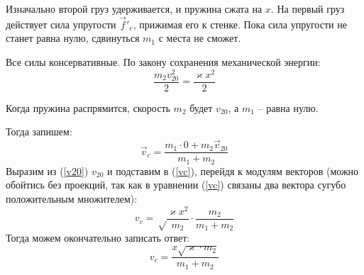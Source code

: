 \documentclass[a5paper,10pt]{article}
\begin{document}
\begin{figure}[H]
\end{figure}

Изначально второй груз удерживается, и пружина сжата на $x$.
На первый груз действует сила упругости $\vec{f}'_e$, прижимая его к стенке. Пока сила упругости не станет равна нулю, сдвинуться $m_1$ с места не сможет.

Все силы консервативные. По закону сохранения механической энергии:
\begin{equation}
\label{v20}
\frac{m_2v_{20}^2}{2}=\frac{\varkappa x^2}{2}
\end{equation}

Когда пружина распрямится, скорость $m_2$ будет $v_{20}$, а $m_1$ -- равна нулю.

Тогда запишем:
\begin{equation}
    \label{vc}
    \vec{v}_c=\frac{m_1\cdot0+m_2\vec{v}_{20}}{m_1+m_2}
\end{equation}
Выразим из (\ref{v20}) $v_{20}$ и подставим в (\ref{vc}), перейдя к модулям векторов (можно обойтись без проекций, так как в уравнении (\ref{vc}) связаны два вектора сугубо положительным множителем):
\begin{equation}
    v_c=\sqrt\frac{\varkappa x^2}{m_2}\cdot \frac{m_2}{m_1+m_2}
\end{equation}
Тогда можем окончательно записать ответ:
\begin{equation}
    v_c=\frac{x\sqrt{\varkappa \cdot m_2}}{m_1+m_2}
\end{equation}
\end{document}
